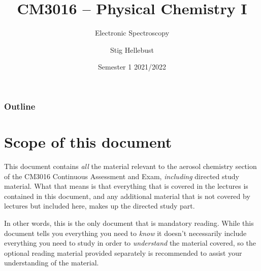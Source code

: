 \documentclass[a4paper,titlepage]{article}
\title{CM3016 -- Physical Chemistry I}
\subtitle{Electronic Spectroscopy}
\author{Stig Hellebust}
\institute{School of Chemistry \\ UCC}
\date{Semester 1 2021/2022}
\begin{document}

\begin{frame}
	\titlepage
\end{frame}

\begin{frame}[plain,allowframebreaks=0.75]
 	\tableofcontents
 	\frametitle{Outline}
\end{frame}

%
%
%

\section*{Scope of this document}
This document contains \emph{all} the material relevant to the aerosol chemistry section of the CM3016 Continuous Assessment and Exam, \emph{including} directed study material. What that means is that everything that is covered in the lectures is contained in this document, and any additional material that is not covered by lectures but included here, makes up the directed study part. 

In other words, this is the only document that is mandatory reading. While this document tells you everything you need to \textit{know} it doesn't necessarily include everything you need to study in order to \textit{understand} the material covered, so the optional reading material provided separately is recommended to assist your understanding of the material.

\end{document}
